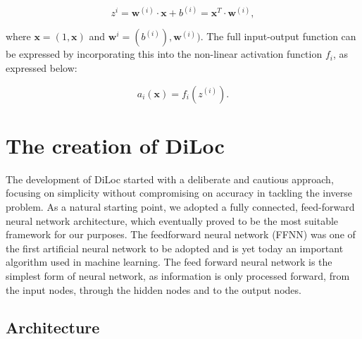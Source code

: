 \documentclass[a4paper, UKenglish, 11pt]{uiomaster}
\begin{document}
\begin{equation}
z^{i} = \boldsymbol{w}^{(i)} \cdot \boldsymbol{x} + b^{(i)} = \mathbf{x}^T \cdot \mathbf{w}^{(i)} ,
\label{eq:linear_transformation}
\end{equation}

where $\mathbf{x} = (1, \boldsymbol{x})$ and $\mathbf{w}^i = (b^{(i)}), \boldsymbol{w}^{(i)})$. The full input-output function can be expressed by incorporating this into the non-linear activation function $f_i$, as expressed below:

\begin{equation}
a_i(\mathbf{x}) = f_i(z^{(i)}) .
\label{eq:linear_transformation}
\end{equation}


\section{The creation of DiLoc}
The development of DiLoc started with a deliberate and cautious approach, focusing on simplicity without compromising on accuracy in tackling the inverse problem. As a natural starting point, we adopted a fully connected, feed-forward neural network architecture, which eventually proved to be the most suitable framework for our purposes. The feedforward neural network (FFNN) was one of the first artificial neural network to be adopted and is yet today an important algorithm used in machine learning. The feed forward neural network is the simplest form of neural network, as information is only processed forward, from the input nodes, through the hidden nodes and to the output nodes.

\subsection{Architecture}

\end{document}
